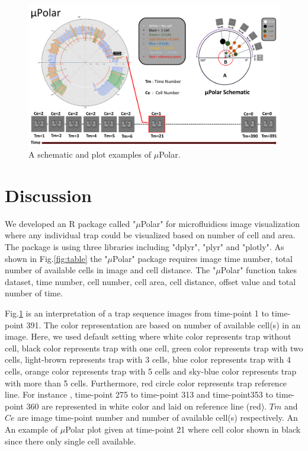 \documentclass[conference]{IEEEtran}
\begin{document}
 
\begin{figure}
\centering
\includegraphics[width=\textwidth,height=10 cm]{Patterns/BC8_tp35.pdf}
\caption{ A schematic and plot examples of $\mu$Polar.}
\label{fig:polar}
\end{figure}

\section{Discussion}
We developed an R package called "$\mu$Polar" for microfluidicss image visualization where any individual trap could be visualized based on number of cell and area. The package is using three libraries including "dplyr", "plyr" and "plotly". As shown in Fig.\ref{fig:table} the "$\mu$Polar" package requires image time number, total number of available cells in image and cell distance. The "$\mu$Polar" function takes dataset, time number, cell number, cell area, cell distance, offset value and total number of time. 

Fig.\ref{fig:polar} is an interpretation of a trap sequence images from time-point 1 to time-point 391. The color representation are based on number of available cell(s) in an image. Here, we used default setting where white color represents trap without cell, black color represents trap with one cell, green color represents trap with two cells, light-brown represents trap with 3 cells, blue color represents trap with 4 cells, orange color represents trap with 5 cells and sky-blue color represents trap with more than 5 cells. Furthermore, red circle color represents trap reference line. For instance , time-point 275 to  time-point 313 and time-point353 to time-point 360 are represented in white color and  laid on reference line (red). $ Tm  $ and  $ Ce $  are image time-point number and number of available cell(s) respectively. An An example of $\mu$Polar plot given at time-point 21 where cell color shown in black since there only single cell available.  
\end{document}
